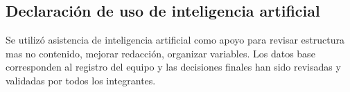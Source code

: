 \documentclass[12pt,a4paper]{article}
\begin{document}
\begin{center}
		\section*{Declaración de uso de inteligencia artificial}
		
		Se utilizó asistencia de inteligencia artificial como apoyo para revisar estructura mas no contenido, mejorar redacción, organizar variables. Los datos base corresponden al registro del equipo y las decisiones finales han sido revisadas y validadas por todos los integrantes.
	\end{center}
	
\end{document}
